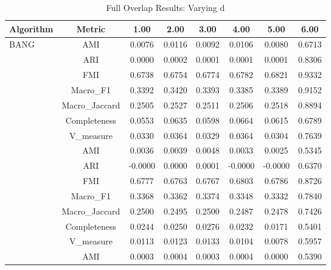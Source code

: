 \begin{table}[ht!]
\centering
\caption{Full Overlap Results: Varying d}
\label{tab:overlap_vary_d_full}
\begin{tabular*}{\linewidth}{@{} lc c c c c c c @{}}
\toprule
Algorithm & Metric & 1.00 & 2.00 & 3.00 & 4.00 & 5.00 & 6.00 \\
\midrule
\multirow{7}{*}{BANG}
 & AMI  & 0.0076 & 0.0116 & 0.0092 & 0.0106 & 0.0080 & 0.6713 \\

 & ARI  & 0.0000 & 0.0002 & 0.0001 & 0.0001 & 0.0001 & 0.8306 \\

 & FMI  & 0.6738 & 0.6754 & 0.6774 & 0.6782 & 0.6821 & 0.9332 \\

 & Macro_F1  & 0.3392 & 0.3420 & 0.3393 & 0.3385 & 0.3389 & 0.9152 \\

 & Macro_Jaccard  & 0.2505 & 0.2527 & 0.2511 & 0.2506 & 0.2518 & 0.8894 \\

 & Completeness  & 0.0553 & 0.0635 & 0.0598 & 0.0664 & 0.0615 & 0.6789 \\

 & V_measure  & 0.0330 & 0.0364 & 0.0329 & 0.0364 & 0.0304 & 0.7639 \\
\addlinespace
\multirow{7}{*}{CLIQUE}
 & AMI  & 0.0036 & 0.0039 & 0.0048 & 0.0033 & 0.0025 & 0.5345 \\

 & ARI  & -0.0000 & 0.0000 & 0.0001 & -0.0000 & -0.0000 & 0.6370 \\

 & FMI  & 0.6777 & 0.6763 & 0.6767 & 0.6803 & 0.6786 & 0.8726 \\

 & Macro_F1  & 0.3368 & 0.3362 & 0.3374 & 0.3348 & 0.3332 & 0.7840 \\

 & Macro_Jaccard  & 0.2500 & 0.2495 & 0.2500 & 0.2487 & 0.2478 & 0.7426 \\

 & Completeness  & 0.0244 & 0.0250 & 0.0276 & 0.0232 & 0.0171 & 0.5401 \\

 & V_measure  & 0.0113 & 0.0123 & 0.0133 & 0.0104 & 0.0078 & 0.5957 \\
\addlinespace
\multirow{7}{*}{DBSCAN}
 & AMI  & 0.0003 & 0.0004 & 0.0003 & 0.0004 & 0.0000 & 0.5390 \\


\end{tabular*}
\end{table}
